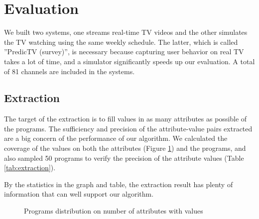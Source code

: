 \section{Evaluation}
\label{sec:eval}

We built two systems, one streams real-time TV videos and the other 
simulates the TV watching using the same weekly schedule. The latter, 
which is called ''PredicTV (survey)'', is necessary because capturing 
user behavior on real TV takes a lot of time, and a simulator significantly 
speeds up our evaluation. A total of 81 channels are included in the systems.

\subsection{Extraction}
The target of the extraction is to fill values in as many attributes as 
possible of the programs. The sufficiency and precision of the attribute-value 
pairs extracted are a big concern of the performance of our algorithm. We calculated the coverage of the values
on both the attributes (Figure \ref{fig:extraction}) and the programs, and also 
sampled 50 programs to verify the precision of the attribute values
(Table \ref{tab:extraction}).

By the statistics in the graph and table, the extraction result has plenty 
of information that can well support our algorithm.

\begin{figure}[h]
\begin{center}
\caption{\label{fig:extraction}Programs distribution on number of attributes with values}
\end{center}
\end{figure}

